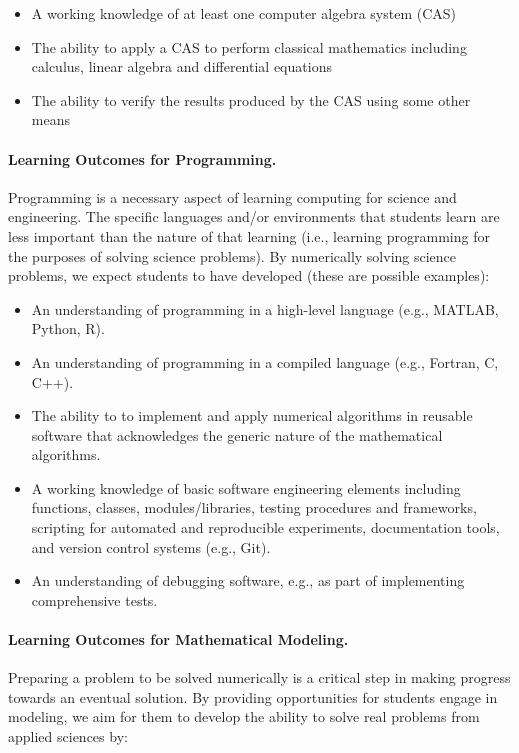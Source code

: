\documentclass[graybox,envcountchap,sectrefs]{svmult}
\begin{document}
\begin{itemize}
\item A working knowledge of at least one computer algebra system (CAS)

\item The ability to apply a CAS to perform classical mathematics including calculus, linear algebra and differential equations

\item The ability to verify the results produced by the CAS using some other means
\end{itemize}

\noindent
\paragraph{Learning Outcomes for Programming.}
Programming is a necessary aspect of learning computing for science and engineering. The specific languages and/or environments that students learn are less important than the nature of that learning (i.e., learning programming for the purposes of solving science problems). By numerically solving science problems, we expect students to have developed (these are possible examples):

\begin{itemize}
\item An understanding of programming in a high-level language (e.g., MATLAB, Python, R).

\item An understanding of programming in a compiled language (e.g., Fortran, C, C++).

\item The ability to to implement and apply numerical algorithms in reusable software that acknowledges the generic nature of the mathematical algorithms.

\item A working knowledge of basic software engineering elements including functions, classes, modules/libraries, testing procedures and frameworks, scripting for automated and reproducible experiments, documentation tools, and version control systems (e.g., Git).

\item An understanding of debugging software, e.g., as part of implementing comprehensive tests.
\end{itemize}

\noindent
\paragraph{Learning Outcomes for Mathematical Modeling.}
Preparing a problem to be solved numerically is a critical step in making progress towards an eventual solution. By providing opportunities for students engage in modeling, we aim for them to develop the ability to solve real problems from applied sciences by:
\end{document}
